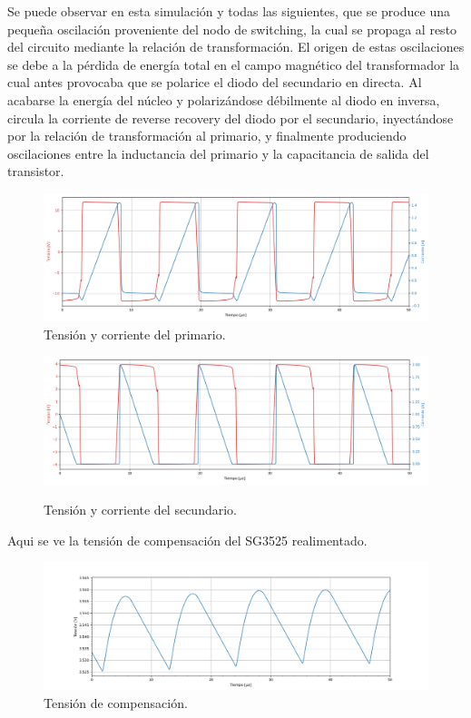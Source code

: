 Se puede observar en esta simulación y todas las siguientes, que se produce una pequeña oscilación proveniente del nodo de switching, la cual se propaga al resto del circuito mediante la relación de transformación. El origen de estas oscilaciones se debe a la pérdida de energía total en el campo magnético del transformador la cual antes provocaba que se polarice el diodo del secundario en directa. Al acabarse la energía del núcleo y polarizándose débilmente al diodo en inversa, circula la corriente de reverse recovery del diodo por el secundario, inyectándose por la relación de transformación al primario, y finalmente produciendo oscilaciones entre la inductancia del primario y la capacitancia de salida del transistor.

\begin{figure}[H]
	\centering
	\includegraphics[width=0.9\linewidth]{ImagenesParteIII/Primario.png}
	\caption{Tensión y corriente del primario.}
	\label{fig:primarioIII}

\end{figure}

\begin{figure}[H]
	\centering
	\includegraphics[width=0.9\linewidth]{ImagenesParteIII/Secundario.png}
	\label{fig:secundarioiii}
	\caption{Tensión y corriente del secundario.}
\end{figure}
Aqui se ve la tensión de compensación del SG3525 realimentado.
\begin{figure}[H]
	\centering
	\includegraphics[width=0.9\linewidth]{ImagenesParteIII/Vcom.png}
	\caption{Tensión de compensación.}
	\label{fig:com3}

\end{figure}

